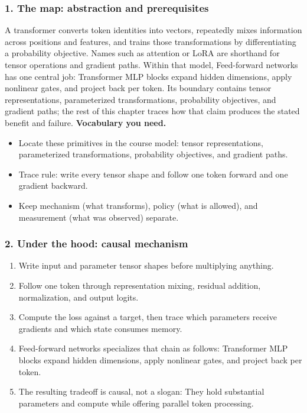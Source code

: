 \subsubsection*{1. The map: abstraction and prerequisites}
A transformer converts token identities into vectors, repeatedly mixes information across positions and features, and trains those transformations by differentiating a probability objective. Names such as attention or LoRA are shorthand for tensor operations and gradient paths.
Within that model, Feed-forward networks has one central job: Transformer MLP blocks expand hidden dimensions, apply nonlinear gates, and project back per token. Its boundary contains tensor representations, parameterized transformations, probability objectives, and gradient paths; the rest of this chapter traces how that claim produces the stated benefit and failure.
\textbf{Vocabulary you need.}\begin{itemize}
\item Locate these primitives in the course model: tensor representations, parameterized transformations, probability objectives, and gradient paths.
\item Trace rule: write every tensor shape and follow one token forward and one gradient backward.
\item Keep mechanism (what transforms), policy (what is allowed), and measurement (what was observed) separate.
\end{itemize}
\subsubsection*{2. Under the hood: causal mechanism}\begin{enumerate}
\item Write input and parameter tensor shapes before multiplying anything.
\item Follow one token through representation mixing, residual addition, normalization, and output logits.
\item Compute the loss against a target, then trace which parameters receive gradients and which state consumes memory.
\item Feed-forward networks specializes that chain as follows: Transformer MLP blocks expand hidden dimensions, apply nonlinear gates, and project back per token.
\item The resulting tradeoff is causal, not a slogan: They hold substantial parameters and compute while offering parallel token processing.
\end{enumerate}
